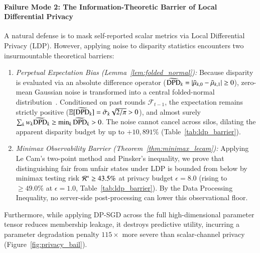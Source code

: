 \paragraph{Failure Mode 2: The Information-Theoretic Barrier of Local Differential Privacy}
A natural defense is to mask self-reported scalar metrics via Local Differential Privacy (LDP). However, applying noise to disparity statistics encounters two insurmountable theoretical barriers:
\begin{enumerate}[leftmargin=*]
    \item \emph{Perpetual Expectation Bias (Lemma~\ref{lem:folded_normal}):} Because disparity is evaluated via an absolute difference operator ($\widetilde{\mathrm{DPD}}_k = |\tilde\mu_{k,0} - \tilde\mu_{k,1}| \ge 0$), zero-mean Gaussian noise is transformed into a central folded-normal distribution~\citep{leone1961folded}. Conditioned on past rounds $\mathcal{F}_{t-1}$, the expectation remains strictly positive ($\mathbb{E}[\widetilde{\mathrm{DPD}}_k] = \tilde\sigma_k \sqrt{2/\pi} > 0$), and almost surely $\sum_k w_k \widetilde{\mathrm{DPD}}_k \ge \min_k \widetilde{\mathrm{DPD}}_k > 0$. The noise cannot cancel across silos, dilating the apparent disparity budget by up to $+10{,}891\%$ (Table~\ref{tab:ldp_barrier}).
    \item \emph{Minimax Observability Barrier (Theorem~\ref{thm:minimax_lecam}):} Applying Le Cam's two-point method and Pinsker's inequality, we prove that distinguishing fair from unfair states under LDP is bounded from below by minimax testing risk $\mathcal{R}^* \ge 43.5\%$ at privacy budget $\epsilon = 8.0$ (rising to $\ge 49.0\%$ at $\epsilon = 1.0$, Table~\ref{tab:ldp_barrier}). By the Data Processing Inequality, no server-side post-processing can lower this observational floor.
\end{enumerate}
Furthermore, while applying DP-SGD across the full high-dimensional parameter tensor reduces membership leakage, it destroys predictive utility, incurring a parameter degradation penalty $115\times$ more severe than scalar-channel privacy (Figure~\ref{fig:privacy_bail}).


